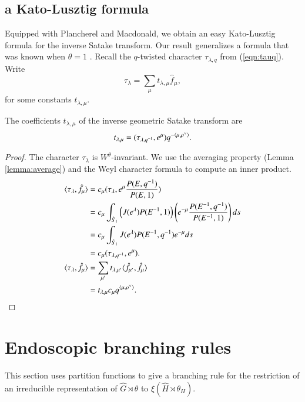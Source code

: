 \subsection{a Kato-Lusztig formula}

Equipped with Plancherel and Macdonald, we obtain an easy Kato-Lusztig
formula for the inverse Satake transform.  Our result generalizes a
formula that was known when $\theta=1$ \cite{kato1982spherical}
\cite{lusztig1983singularities}.  Recall the $q$-twisted character
$\tau_{\lambda,q}$ from (\ref{eqn:tauq}).  Write
\[
\tau_\lambda = \sum_\mu t_{\lambda,\mu}  \hat f_\mu,
\]
for some constants $t_{\lambda,\mu}$.

\begin{theorem}
  The coefficients $t_{\lambda,\mu}$ of the inverse geometric Satake
  transform are
\[
t_{\lambda,\mu} =  (\tau_{\lambda,q^{-1}},e^\mu) q^{-\langle{\mu,\rho^\vee}\rangle}.
\]
\end{theorem}

\begin{proof}
  The character $\tau_\lambda$ is $W^\theta$-invariant.  We use the
  averaging property (Lemma \ref{lemma:average}) and the Weyl
  character formula to compute an inner product.
\begin{align*}
\langle{\tau_\lambda,\hat f_\mu}\rangle
&=c_\mu(\tau_\lambda,e^\mu \frac{P(E,q^{-1})}{P(E,1)})\\
&=c_\mu\int_{\hat S_1} \left(J(e^\lambda) P(E^{-1},1)\right) 
\left( e^{-\mu}\frac{P(E^{-1},q^{-1})}{P(E^{-1},1)} \right) ds\\
&=
c_\mu\int_{\hat S_1} J(e^\lambda) P(E^{-1},q^{-1}) e^{-\mu} ds\\
&= c_\mu(\tau_{\lambda,q^{-1}},e^\mu).\\
\langle{\tau_\lambda,\hat f_\mu}\rangle
&=\sum_{\mu'} t_{\lambda,\mu'} \langle{\hat f_{\mu'},\hat f_\mu}\rangle \\
&= t_{\lambda,\mu} c_\mu q^{\langle{\mu,\rho^\vee}\rangle}.
\end{align*}
\end{proof}


\section{Endoscopic branching rules}\label{sec:branch}

This section uses partition functions to give a branching rule for
the restriction of an irreducible representation of $\hat G\rtimes\theta$
to $\xi(\hat H\rtimes \theta_H)$.

